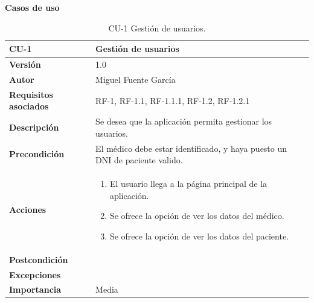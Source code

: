 \textbf{Casos de uso}

\begin{table}[h]
	\centering
	\begin{tabularx}{\linewidth}{ p{} p{} }
		\toprule
		\textbf{CU-1}    & \textbf{Gestión de usuarios}\\
		\toprule
		\textbf{Versión}              & 1.0    \\
		\textbf{Autor}                & Miguel Fuente García \\
		\textbf{Requisitos asociados} & RF-1, RF-1.1, RF-1.1.1, RF-1.2, RF-1.2.1  \\
		\textbf{Descripción}          & Se desea que la aplicación permita gestionar los usuarios. \\
		\textbf{Precondición}         & El médico debe estar identificado, y haya puesto un DNI de paciente valido. \\
		\textbf{Acciones}             &
		\begin{enumerate}
			\def\labelenumi{\arabic{enumi}.}
			\tightlist
			\item El usuario llega a la página principal de la aplicación.
			\item Se ofrece la opción de ver los datos del médico.
                \item Se ofrece la opción de ver los datos del paciente.
		\end{enumerate}\\
		\textbf{Postcondición}        &  \\
		\textbf{Excepciones}          &  \\
		\textbf{Importancia}          & Media  \\
		\bottomrule
	\end{tabularx}
	\caption{CU-1 Gestión de usuarios.}
\end{table}

